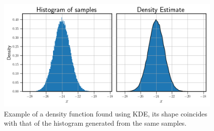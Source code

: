 \begin{figure}[hbt!]
    \centering
    \includegraphics[width=\textwidth]{Figures/kde_example.png}
    \caption{Example of a density function found using KDE, its shape coincides with that
    of the histogram generated from the same samples.}
    \label{fig:kde example}
\end{figure}



